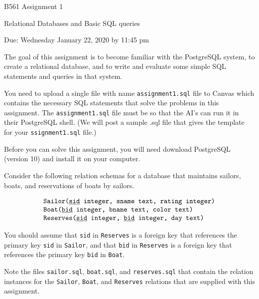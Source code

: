 

\begin{center}{\large B561 Assignment 1}

\medskip
{\large Relational Databases and Basic SQL queries}

\medskip
{Due: Wednesday January 22,  2020 by 11:45 pm}
\end{center}
\bigskip


The goal of this assignment is to become familiar with the PostgreSQL system, 
to create a relational database, and to write and evaluate some simple SQL statements and queries in that system.

You need to upload a single file with name {\tt assignment1.sql} file to Canvas which contains the necessary SQL statements that solve the problems in this assignment.   
The {\tt assignment1.sql} file must be so that the AI's can run it in their PostgreSQL shell.  (We will post a sample .sql file that gives the template for your {\tt ssignment1.sql} file.)

Before you can solve this assignment, you will need download PostgreSQL (version 10) and install it on your computer.

\bigskip
Consider the following relation schemas for a database that maintains
sailors, boats, and reservations of boats by sailors.

{\small
\[\mbox{\tt
\begin{tabular}{l}
  {\tt Sailor}($\underline{\rm {\tt sid}}$ integer, sname text, rating integer) \\
  {\tt Boat}($\underline{\rm {\tt bid}}$ integer, bname text, color text) \\
  {\tt Reserves}($\underline{\rm {\tt sid}}$ integer, $\underline{\rm {\tt bid}}$ integer, day text)
 \end{tabular}}
\]
}

You should assume that {\tt sid} in {\tt Reserves} is a foreign key that references
the primary key {\tt sid} in {\tt Sailor}, and that {\tt bid} in {\tt Reserves} is a foreign key that 
references the primary key {\tt bid} in {\tt Boat}.


Note the files {\tt {\tt sailor}.sql}, {\tt {\tt boat}.sql}, and {\tt {\tt reserves}.sql}
that contain the relation instances for the {\tt Sailor}, {\tt Boat}, and {\tt Reserves}
relations that are supplied with this assignment.

